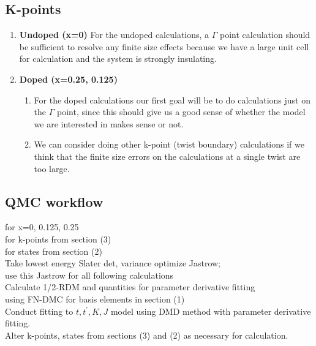 \documentclass{article}
\begin{document}
\subsection{K-points}
\begin{enumerate}
\item \textbf{Undoped (x=0)} For the undoped calculations, a $\Gamma$ point calculation should be sufficient to resolve any finite size effects because we have a large unit cell for calculation and the system is strongly insulating.

\item \textbf{Doped (x=0.25, 0.125)}
\begin{enumerate}
\item For the doped calculations our first goal will be to do calculations just on the $\Gamma$ point, since this should give us a good sense of whether the model we are interested in makes sense or not.

\item We can consider doing other k-point (twist boundary) calculations if we think that the finite size errors on the calculations at a single twist are too large.
\end{enumerate}
\end{enumerate}

\subsection{QMC workflow}
for x=0, 0.125, 0.25 \\
\indent for k-points from section (3) \\ 
\indent \indent for states from section (2) \\
\indent \indent \indent Take lowest energy Slater det, variance optimize Jastrow;\\
\indent \indent \indent use this Jastrow for all following calculations
\\

\indent \indent \indent Calculate 1/2-RDM and quantities for parameter derivative fitting \\ 
\indent \indent \indent using FN-DMC for basis elements in section (1)\\

\noindent Conduct fitting to $t,t^\prime, K,J$ model using DMD method with parameter derivative fitting. \\

\noindent Alter k-points, states from sections (3) and (2) as necessary for calculation.  
\end{document}
